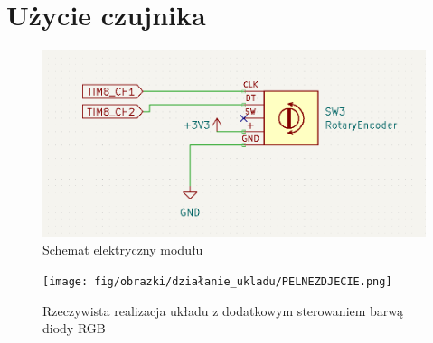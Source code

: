 \documentclass[11pt, a4paper]{article}
\begin{document}
\newpage

\section{Użycie czujnika}



\vspace{0.5cm}
\begin{figure}[h!]
    \centering
    \includegraphics[scale=0.70]{fig/obrazki/polaczenie_modulu/SCHEMAT.png}
    \caption{Schemat elektryczny modułu}
    \label{fig:my_label}
\end{figure}
\vspace{0.5cm}



\vspace{0.5cm}
\begin{figure}[h!]
    \centering
    \texttt{[image: fig/obrazki/działanie\_ukladu/PELNEZDJECIE.png]}
    \caption{Rzeczywista realizacja układu z dodatkowym sterowaniem barwą diody RGB}
    \label{fig:my_label}
\end{figure}
\vspace{0.5cm}
\end{document}
